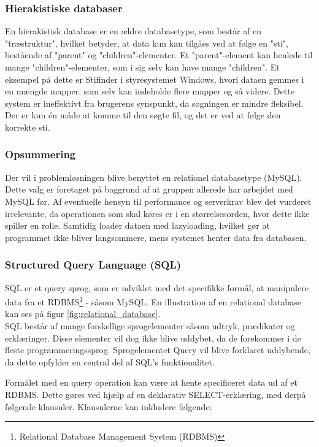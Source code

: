 \subsubsection{Hierakistiske databaser}
En hierakistisk database er en ældre databasetype, som består af en "træstruktur", hvilket betyder, at data kun kan tilgåes ved at følge en "sti", bestående af "parent" og "children"\mbox{}-elementer. Et "parent"\mbox{}-element kan henlede til mange "children"\mbox{}-elementer, som i sig selv kan have mange "children". Et eksempel på dette er Stifinder i styresystemet Windows, hvori dataen gemmes i en mængde mapper, som selv kan indeholde flere mapper og så videre. Dette system er ineffektivt fra brugerens synspunkt, da søgningen er mindre fleksibel. Der er kun én måde at komme til den søgte fil, og det er ved at følge den korrekte sti. \cite{database_hvad}

\subsubsection{Opsummering}
Der vil i problemløsningen blive benyttet en relationel databasetype (MySQL). Dette valg er foretaget på baggrund af at gruppen allerede har arbejdet med MySQL før. Af eventuelle hensyn til performance og serverkrav blev det vurderet irrelevante, da operationen som skal køres er i en størrelsesorden, hvor dette ikke spiller en rolle. Samtidig loader dataen med lazyloading, hvilket gør at programmet ikke bliver langsommere, mens systemet henter data fra databasen.

\subsubsection{Structured Query Language (SQL)}
SQL er et query sprog, som er udviklet med det specifikke formål, at manipulere data fra et RDBMS\footnote{Relational Database Management System (RDBMS)} - såsom MySQL. En illustration af en relational database kan ses på figur \ref{fig:relational_database}.\\

SQL består af mange forskellige sprogelementer såsom udtryk, prædikater og erklæringer. Disse elementer vil dog ikke blive uddybet, da de forekommer i de fleste programmeringssprog. Sprogelementet Query vil blive forklaret uddybende, da dette opfylder en central del af SQL's funktionalitet.

Formålet med en query operation kan være at hente specificeret data ud af et RDBMS. Dette gøres ved hjælp af en deklarativ SELECT-erklæring, med derpå følgende klausuler. Klausulerne kan inkludere følgende:

